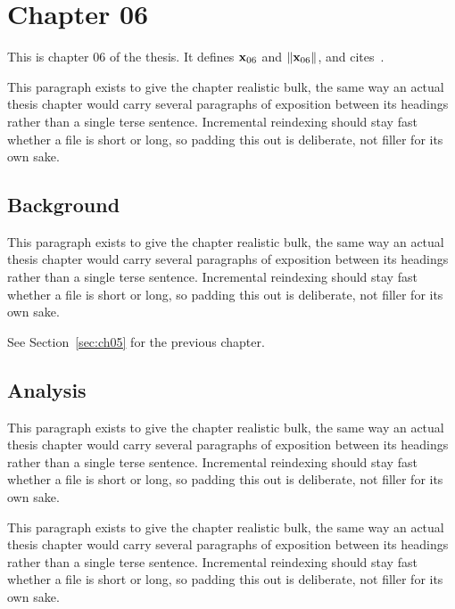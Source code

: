 \section{Chapter 06}
\label{sec:ch06}

This is chapter 06 of the thesis. It defines $\mathbf{x}_{06}$ and $\lVert \mathbf{x}_{06} \rVert$, and cites~\cite{ref1}.

This paragraph exists to give the chapter realistic bulk, the same way an actual thesis chapter would carry several paragraphs of exposition between its headings rather than a single terse sentence. Incremental reindexing should stay fast whether a file is short or long, so padding this out is deliberate, not filler for its own sake.

\subsection{Background}
\label{sec:ch06:background}

This paragraph exists to give the chapter realistic bulk, the same way an actual thesis chapter would carry several paragraphs of exposition between its headings rather than a single terse sentence. Incremental reindexing should stay fast whether a file is short or long, so padding this out is deliberate, not filler for its own sake.

See Section~\ref{sec:ch05} for the previous chapter.

\subsection{Analysis}
\label{sec:ch06:analysis}

This paragraph exists to give the chapter realistic bulk, the same way an actual thesis chapter would carry several paragraphs of exposition between its headings rather than a single terse sentence. Incremental reindexing should stay fast whether a file is short or long, so padding this out is deliberate, not filler for its own sake.

This paragraph exists to give the chapter realistic bulk, the same way an actual thesis chapter would carry several paragraphs of exposition between its headings rather than a single terse sentence. Incremental reindexing should stay fast whether a file is short or long, so padding this out is deliberate, not filler for its own sake.
